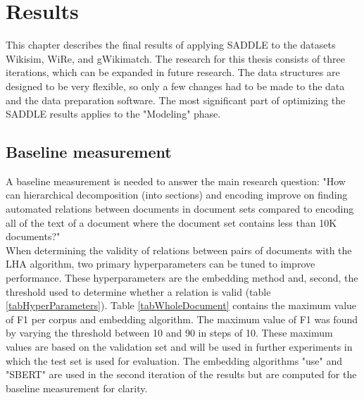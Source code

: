 \pagebreak
\chapter{Results}
\label{secResults}

This chapter describes the final results of applying SADDLE to the datasets Wikisim, WiRe, and gWikimatch. The research for this thesis consists of three iterations, which can be expanded in future research. The data structures are designed to be very flexible, so only a few changes had to be made to the data and the data preparation software. The most significant part of optimizing the SADDLE results applies to the "Modeling" phase.

\section{Baseline measurement}
\label{resultsBaselineMeasurement}
A baseline measurement is needed to answer the main research question: "How can hierarchical decomposition (into sections) and encoding improve on finding automated relations between documents in document sets compared to encoding all of the text of a document where the document set contains less than 10K documents?" \\


When determining the validity of relations between pairs of documents with the LHA algorithm, two primary hyperparameters can be tuned to improve performance. These hyperparameters are the embedding method and, second, the threshold used to determine whether a relation is valid (table \ref{tabHyperParameters}). Table \ref{tabWholeDocument} contains the maximum value of F1 per corpus and embedding algorithm. The maximum value of F1 was found by varying the threshold between 10 and 90 in steps of 10. These maximum values are based on the validation set and will be used in further experiments in which the test set is used for evaluation. The embedding algorithms "use" and "SBERT" are used in the second iteration of the results but are computed for the baseline measurement for clarity.\\


